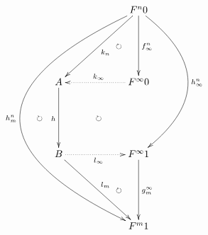 \documentclass[12pt]{article}
\begin{document}
\pagestyle{empty}

\begin{align*}
  \vcenter{
    \xymatrix@=60pt{
      &
      F^n 0
      \ar@{->}[ld]^{k_n}
      \ar@/_20pt/@{{}{ }{}}[d]|{\circlearrowright}
      \ar@{->}[d]^{f^n_\infty}
      \ar@/^50pt/@{->}[dd]^{h^n_\infty}
      \ar@/_120pt/@{->}[ddd]_{h^n_m}
      \ar@/_100pt/@{{}{ }{}}[ddd]|{\circlearrowright}
      \\
      A
      \ar@{->}[d]_{h}
      \ar@{{}{ }{}}[rd]|{\circlearrowright}
      &
      F^\infty 0
      \ar@{.>}[l]_{k_\infty}
      \\
      B
      \ar@{->}[rd]^{l_m}
      \ar@{.>}[r]_{l_\infty}
      &
      F^\infty 1
      \ar@{->}[d]^{g^\infty_m}
      \ar@/_20pt/@{{}{ }{}}[d]|{\circlearrowright}
      \\
      &
      F^m 1
    }
  }
\end{align*}
\end{document}
